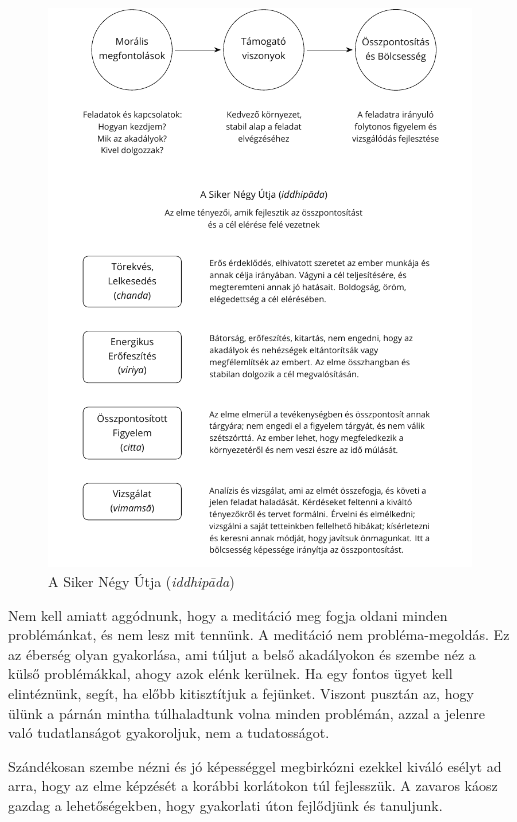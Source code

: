 \clearpage
\figurepagelayout

\begin{figure}[h]
\caption{A Siker Négy Útja (\emph{iddhipāda})}\label{fig-success}
\bigskip
\includegraphics[width=0.95\linewidth]{./manuscript/tex/diagrams/paths-to-success-hu.pdf}
\end{figure}

\clearpage
\normalpagelayout

Nem kell amiatt aggódnunk, hogy a meditáció meg fogja oldani minden
problémánkat, és nem lesz mit tennünk. A meditáció nem
probléma-megoldás. Ez az éberség olyan gyakorlása, ami túljut a belső
akadályokon és szembe néz a külső problémákkal, ahogy azok elénk
kerülnek. Ha egy fontos ügyet kell elintéznünk, segít, ha előbb
kitisztítjuk a fejünket. Viszont pusztán az, hogy ülünk a párnán mintha
túlhaladtunk volna minden problémán, azzal a jelenre való tudatlanságot
gyakoroljuk, nem a tudatosságot.

Szándékosan szembe nézni és jó képességgel megbirkózni ezekkel kiváló
esélyt ad arra, hogy az elme képzését a korábbi korlátokon túl
fejlesszük. A zavaros káosz gazdag a lehetőségekben, hogy gyakorlati
úton fejlődjünk és tanuljunk.

